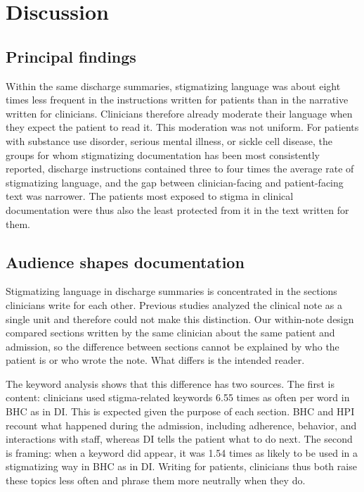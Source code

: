 \section{Discussion}
\subsection{Principal findings}
Within the same discharge summaries, stigmatizing language was about eight times less frequent in the instructions written for patients than in the narrative written for clinicians. Clinicians therefore already moderate their language when they expect the patient to read it. This moderation was not uniform. For patients with substance use disorder, serious mental illness, or sickle cell disease, the groups for whom stigmatizing documentation has been most consistently reported,\cite{himmelstein2022,goddu2018} discharge instructions contained three to four times the average rate of stigmatizing language, and the gap between clinician-facing and patient-facing text was narrower. The patients most exposed to stigma in clinical documentation were thus also the least protected from it in the text written for them.

\subsection{Audience shapes documentation}
Stigmatizing language in discharge summaries is concentrated in the sections clinicians write for each other. Previous studies analyzed the clinical note as a single unit and therefore could not make this distinction.\cite{himmelstein2022,harrigian2023,xue2026,walker2025,scroggins2025} Our within-note design compared sections written by the same clinician about the same patient and admission, so the difference between sections cannot be explained by who the patient is or who wrote the note. What differs is the intended reader.

The keyword analysis shows that this difference has two sources. The first is content: clinicians used stigma-related keywords 6.55 times as often per word in BHC as in DI. This is expected given the purpose of each section. BHC and HPI recount what happened during the admission, including adherence, behavior, and interactions with staff, whereas DI tells the patient what to do next. The second is framing: when a keyword did appear, it was 1.54 times as likely to be used in a stigmatizing way in BHC as in DI. Writing for patients, clinicians thus both raise these topics less often and phrase them more neutrally when they do.

